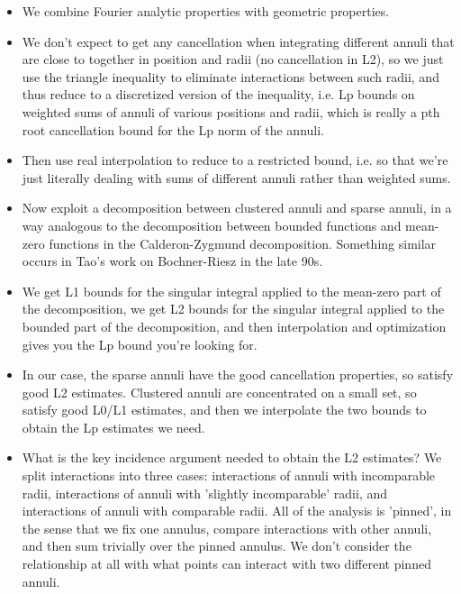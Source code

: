 \documentclass[11pt]{article}
\begin{document}
\begin{itemize}
    \item We combine Fourier analytic properties with geometric properties.

    \item We don't expect to get any cancellation when integrating different annuli that are close to together in position and radii (no cancellation in L2), so we just use the triangle inequality to eliminate interactions between such radii, and thus reduce to a discretized version of the inequality, i.e. Lp bounds on weighted sums of annuli of various positions and radii, which is really a pth root cancellation bound for the Lp norm of the annuli.

    \item Then use real interpolation to reduce to a restricted bound, i.e. so that we're just literally dealing with sums of different annuli rather than weighted sums.

    \item Now exploit a decomposition between clustered annuli and sparse annuli, in a way analogous to the decomposition between bounded functions and mean-zero functions in the Calderon-Zygmund decomposition. Something similar occurs in Tao's work on Bochner-Riesz in the late 90s.

    \item We get L1 bounds for the singular integral applied to the mean-zero part of the decomposition, we get L2 bounds for the singular integral applied to the bounded part of the decomposition, and then interpolation and optimization gives you the Lp bound you're looking for.

    \item In our case, the sparse annuli have the good cancellation properties, so satisfy good L2 estimates. Clustered annuli are concentrated on a small set, so satisfy good L0/L1 estimates, and then we interpolate the two bounds to obtain the Lp estimates we need.

    \item What is the key incidence argument needed to obtain the L2 estimates? We split interactions into three cases: interactions of annuli with incomparable radii, interactions of annuli with 'slightly incomparable' radii, and interactions of annuli with comparable radii. All of the analysis is 'pinned', in the sense that we fix one annulus, compare interactions with other annuli, and then sum trivially over the pinned annulus. We don't consider the relationship at all with what points can interact with two different pinned annuli.


\end{itemize}
\end{document}

